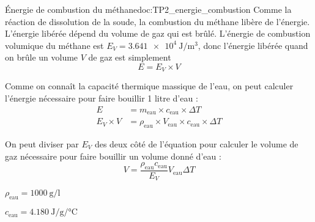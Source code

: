 \begin{doc}{Énergie de combustion du méthane}{doc:TP2_energie_combustion}
  Comme la réaction de dissolution de la soude, la combustion du méthane libère de l'énergie.
  L'énergie libérée dépend du volume de gaz qui est brûlé.
  L'énergie de combustion volumique du méthane est $E_V = \qty{3,641e4}{\joule\per\m\cubed}$, donc l'énergie libérée quand on brûle un volume $V$ de gaz est simplement 
  \begin{equation*}
    E = E_V \times V
  \end{equation*}

  Comme on connaît la capacité thermique massique de l'eau, on peut calculer l'énergie nécessaire pour faire bouillir 1 litre d'eau :
  \begin{align*}
    E &= m_\text{eau} \times c_\text{eau} \times \Delta T \\
    E_V \times V &= \rho_\text{eau} \times V_\text{eau} \times c_\text{eau} \times \Delta T
  \end{align*}

  On peut diviser par $E_V$ des deux côté de l'équation pour calculer le volume de gaz nécessaire pour faire bouillir un volume donné d'eau :
  \begin{equation*}
    V = \dfrac{\rho_\text{eau} c_\text{eau}}{E_V} V_\text{eau} \Delta T
  \end{equation*}

  \begin{donnees}
    \item $\rho_\text{eau} = \qty{1000}{\g\per\litre}$
    \item $c_\text{eau} = \qty{4,180}{\joule\per\g\per\degreeCelsius}$
  \end{donnees}
\end{doc}



